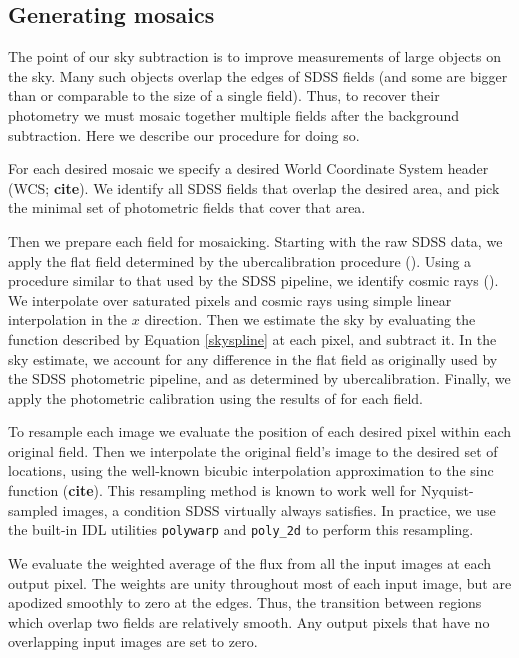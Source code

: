 \documentclass[10pt,preprint]{aastex}
\begin{document}
\subsection{Generating mosaics}

The point of our sky subtraction is to improve measurements of large
objects on the sky.  Many such objects overlap the edges of SDSS
fields (and some are bigger than or comparable to the size of a single
field).  Thus, to recover their photometry we must mosaic together
multiple fields after the background subtraction. Here we describe our
procedure for doing so.

For each desired mosaic we specify a desired World Coordinate System
header (WCS; {\bf cite}). We identify all SDSS fields that overlap the
desired area, and pick the minimal set of photometric fields that
cover that area.

Then we prepare each field for mosaicking.  Starting with the raw SDSS
data, we apply the flat field determined by the ubercalibration
procedure (\citealt{padmanabhan07b}). Using a procedure similar to
that used by the SDSS pipeline, we identify cosmic rays
(\citealt{lupton01a}). We interpolate over saturated pixels and cosmic
rays using simple linear interpolation in the $x$ direction.  Then we
estimate the sky by evaluating the function described by Equation
\ref{skyspline} at each pixel, and subtract it. In the sky estimate,
we account for any difference in the flat field as originally used by
the SDSS photometric pipeline, and as determined by
ubercalibration. Finally, we apply the photometric calibration using
the results of \citet{padmanabhan07b} for each field.

To resample each image we evaluate the position of each desired pixel
within each original field. Then we interpolate the original field's
image to the desired set of locations, using the well-known bicubic
interpolation approximation to the sinc function ({\bf cite}). This
resampling method is known to work well for Nyquist-sampled images, a
condition SDSS virtually always satisfies. In practice, we use the
built-in IDL utilities {\tt polywarp} and {\tt poly\_2d} to perform
this resampling.

We evaluate the weighted average of the flux from all the input images
at each output pixel. The weights are unity throughout most of each
input image, but are apodized smoothly to zero at the edges. Thus, the
transition between regions which overlap two fields are relatively
smooth. Any output pixels that have no overlapping input images are
set to zero.
\end{document}
